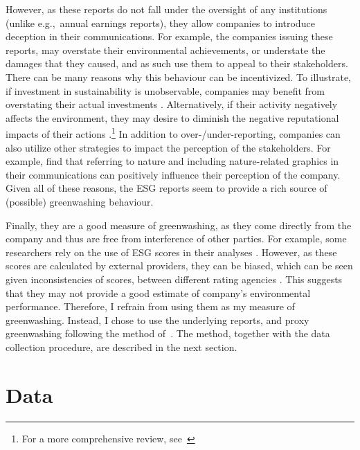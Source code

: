 \documentclass[12pt]{article}
\begin{document}
However, as these reports do not fall under the oversight of any institutions (unlike e.g.,~annual earnings reports), they allow companies to introduce deception in their communications. For example, the companies issuing these reports, may overstate their environmental achievements, or understate the damages that they caused, and as such use them to appeal to their stakeholders. There can be many reasons why this behaviour can be incentivized. To illustrate, if investment in sustainability is unobservable, companies may benefit from overstating their actual investments \parencite{wuBadGreenwashingGood2020}. Alternatively, if their activity negatively affects the environment, they may desire to diminish the negative reputational impacts of their actions \parencite{marquisScrutinyNormsSelective2016, binglerCheapTalkCherrypicking2022}.\footnote{For a more comprehensive review, see~\cite{kimGreenwashVsBrownwash2015}} In addition to over-/under-reporting, companies can also utilize other strategies to impact the perception of the stakeholders. For example, \textcite{parguelCanEvokingNature2015,schmuckMisleadingConsumersGreen2018} find that referring to nature and including nature-related graphics in their communications can positively influence their perception of the company. Given all of these reasons, the ESG reports seem to provide a rich source of (possible) greenwashing behaviour.


Finally, they are a good measure of greenwashing, as they come directly from the company and thus are free from interference of other parties. For example, some researchers rely on the use of ESG scores in their analyses \parencite{servaesImpactCorporateSocial2013, flammerDoesCorporateSocial2015, linsSocialCapitalTrust2017}. However, as these scores are calculated by external providers, they can be biased, which can be seen given inconsistencies of scores, between different rating agencies \parencite{bergAggregateConfusionDivergence2022, chatterjiRatingsFirmsConverge2016}. This suggests that they may not provide a good estimate of company's environmental performance. Therefore, I refrain from using them as my measure of greenwashing. Instead, I chose to use the underlying reports, and proxy greenwashing following the method of~\textcite{binglerHowCheapTalk2024}. The method, together with the data collection procedure, are described in the next section.


\section{Data}\label{sect:data}
\end{document}
